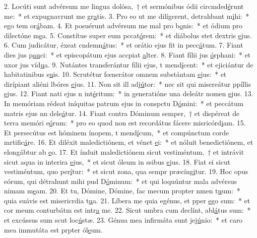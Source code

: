 2. Locúti sunt advérsum me lingua dolósa,~† et sermónibus ódii circmded\uline{é}runt me:~* et expugnavrunt me gr\uline{a}tis.
3. Pro eo ut me dilígerent, detrahbant m\uline{i}hi:~* ego tem or\uline{á}bam.
4. Et posuérunt advérsum me mal pro b\uline{o}nis:~* et ódium pro dilectóne m\uline{e}a.
5. Constítue super eum pccat\uline{ó}rem:~* et diábolus stet  dextris \uline{e}jus.
6. Cum judicátur, éxeat cndemn\uline{á}tus:~* et orátio ejus fit in pecc\uline{á}tum.
7. Fiant dies jus p\uline{au}ci:~* et episcopátum ejus accpiat \uline{a}lter.
8. Fiant fílii jus \uline{ó}rphani:~* et uxor jus víd\uline{u}a.
9. Nutántes transferántur fílii ejus, t mend\uline{í}cent:~* et ejiciántur de habitatinibus s\uline{u}is.
10. Scrutétur fœnerátor omnem substántam \uline{e}jus:~* et dirípiant aliéni lbóres \uline{e}jus.
11. Non sit ill adj\uline{ú}tor:~* nec sit qui misereátur ppíllis \uline{e}jus.
12. Fiant nati ejus n int\uline{é}ritum:~* in generatióne una deleátr nomen \uline{e}jus.
13. In memóriam rédeat iníquitas patrum ejus in conspctu D\uline{ó}mini:~* et peccátum matris ejus nn dele\uline{á}tur.
14. Fiant contra Dóminum semper,~† et dispéreat de terra memóri e\uline{ó}rum:~* pro eo quod non est recordátus fácere misricórd\uline{i}am.
15. Et persecútus est hóminem ínopem, t mend\uline{í}cum,~* et compúnctum corde mrtific\uline{á}re.
16. Et diléxit maledictiónem, et vénet \uline{e}i:~* et nóluit benedictiónem, et elongábtur ab \uline{e}o.
17. Et índuit maledictiónem sicut vestiméntum,~† et intrávit sicut aqua in interira \uline{e}jus,~* et sicut óleum in ssibus \uline{e}jus.
18. Fiat ei sicut vestiméntum, quo per\uline{í}tur:~* et sicut zona, qua sempr præcíng\uline{i}tur.
19. Hoc opus eórum, qui détrahunt mihi pud D\uline{ó}minum:~* et qui loquúntur mala advérsus nimam m\uline{e}am.
20. Et tu, Dómine, Dómine, fac mecum propter nmen t\uline{u}um:~* quia suávis est misericrdia t\uline{u}a.
21. Líbera me quia egénus, et pper \uline{e}go sum:~* et cor meum conturbátm est intr\uline{a} me.
22. Sicut umbra cum declínt, abl\uline{á}tus sum:~* et excússus sum scut loc\uline{ú}stæ.
23. Génua mea infirmáta sunt  jej\uline{ú}nio:~* et caro mea immutáta est prpter ól\uline{e}um.
